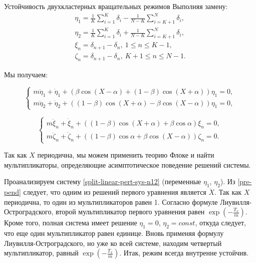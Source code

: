 \begin{chapter}{Устойчивость двухкластерных вращательных режимов}
	Выполняя замену:
	\begin{align*}
		\eta_1 = \frac{1}{K} \sum_{i = 1}^K \delta_i - \frac{1}{N - K} \sum_{i = K + 1}^N \delta_i, \\
		\eta_2 = \frac{1}{K} \sum_{i = 1}^K \delta_i + \frac{1}{N - K} \sum_{i = K + 1}^N \delta_i, \\
		\xi_n = \delta_{n+1} - \delta_n, \ 1 \leq  n \leq K - 1, \\
		\zeta_n = \delta_{n+1} - \delta_n, \ K + 1 \leq n \leq N - 1.
	\end{align*}
		
	Мы получаем:
	
	\begin{equation} \label{split-linear-pert-sys-n12}
		\begin{cases}
			m\ddot{\eta}_1 + \dot{\eta}_1 + \left( \beta \cos{(X - \alpha)} + (1 - \beta) \cos{(X + \alpha)} \right) \eta_1 = 0, \\
			m\ddot{\eta}_2 + \dot{\eta}_2 + \left( (1 - \beta) \cos{(X + \alpha)} - \beta \cos{(X - \alpha)} \right) \eta_1 = 0,
		\end{cases}
	\end{equation}
	
	
	\begin{equation} \label{split-linear-pert-sys-ksi-eta}
		\begin{cases}
			m\ddot{\xi}_n + \dot{\xi}_n + \left( (1 - \beta) \cos{(X + \alpha)} + \beta \cos{\alpha} \right) \xi_n = 0, \\
			m\ddot{\zeta}_n + \dot{\zeta}_n + \left( (1 - \beta) \cos{\alpha} + \beta \cos{(X - \alpha)} \right) \zeta_n = 0.
		\end{cases}
	\end{equation}
	
	Так как $X$ периодична, мы можем применить теорию Флоке
	и найти мультипликаторы, определяющие асимптотическое поведение решений системы.
	
	Проанализируем систему \ref{split-linear-pert-sys-n12} (переменные $\eta_1$, $\eta_2$).
	Из \ref{pre-pend} следует, что одним из
	решений первого уравнения является $\dot{X}$.
	Так как $X$ периодична, то один из мультипликаторов равен 1.
	Согласно формуле Лиувилля-Остроградского, второй мультипликатор первого уравнения равен $\exp{(-\frac{T_x}{m})}$.
	Кроме того, полная система имеет решение $\eta_1 = 0$, $\eta_2 = const$,
	откуда следует, что еще один мультипликатор равен единице.
	Вновь применяя формулу Лиувилля-Остроградского, но
	уже ко всей системе, находим четвертый мультипликатор,
	равный $\exp{(-\frac{T_x}{m})}$. 
	Итак, режим всегда внутренне устойчив.
	

\end{chapter}
